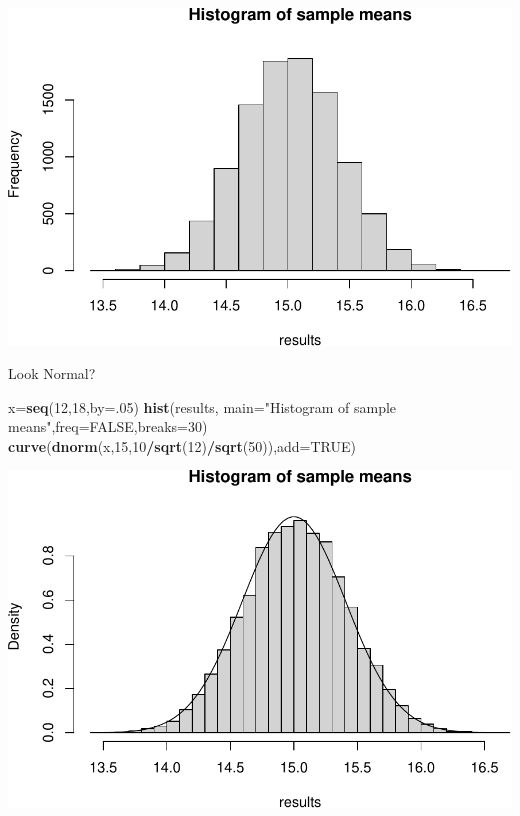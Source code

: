 \documentclass[
]{book}
\newenvironment{Shaded}{\begin{snugshade}}{\end{snugshade}}
\newcommand{\AttributeTok}[1]{\textcolor[rgb]{0.13,0.29,0.53}{#1}}
\newcommand{\ConstantTok}[1]{\textcolor[rgb]{0.56,0.35,0.01}{#1}}
\newcommand{\DecValTok}[1]{\textcolor[rgb]{0.00,0.00,0.81}{#1}}
\newcommand{\FunctionTok}[1]{\textcolor[rgb]{0.13,0.29,0.53}{\textbf{#1}}}
\newcommand{\NormalTok}[1]{#1}
\newcommand{\OtherTok}[1]{\textcolor[rgb]{0.56,0.35,0.01}{#1}}
\newcommand{\SpecialCharTok}[1]{\textcolor[rgb]{0.81,0.36,0.00}{\textbf{#1}}}
\newcommand{\StringTok}[1]{\textcolor[rgb]{0.31,0.60,0.02}{#1}}
\theoremstyle{definition}
\theoremstyle{definition}
\theoremstyle{definition}
\theoremstyle{definition}
\theoremstyle{remark}
\begin{document}
\includegraphics{math340-notes_files/figure-latex/unnamed-chunk-179-1.pdf}

Look Normal?

\begin{Shaded}
\begin{Highlighting}[]
\NormalTok{x}\OtherTok{=}\FunctionTok{seq}\NormalTok{(}\DecValTok{12}\NormalTok{,}\DecValTok{18}\NormalTok{,}\AttributeTok{by=}\NormalTok{.}\DecValTok{05}\NormalTok{)}
\FunctionTok{hist}\NormalTok{(results, }\AttributeTok{main=}\StringTok{"Histogram of sample means"}\NormalTok{,}\AttributeTok{freq=}\ConstantTok{FALSE}\NormalTok{,}\AttributeTok{breaks=}\DecValTok{30}\NormalTok{)}
\FunctionTok{curve}\NormalTok{(}\FunctionTok{dnorm}\NormalTok{(x,}\DecValTok{15}\NormalTok{,}\DecValTok{10}\SpecialCharTok{/}\FunctionTok{sqrt}\NormalTok{(}\DecValTok{12}\NormalTok{)}\SpecialCharTok{/}\FunctionTok{sqrt}\NormalTok{(}\DecValTok{50}\NormalTok{)),}\AttributeTok{add=}\ConstantTok{TRUE}\NormalTok{)}
\end{Highlighting}
\end{Shaded}

\includegraphics{math340-notes_files/figure-latex/unnamed-chunk-180-1.pdf}
\end{document}
